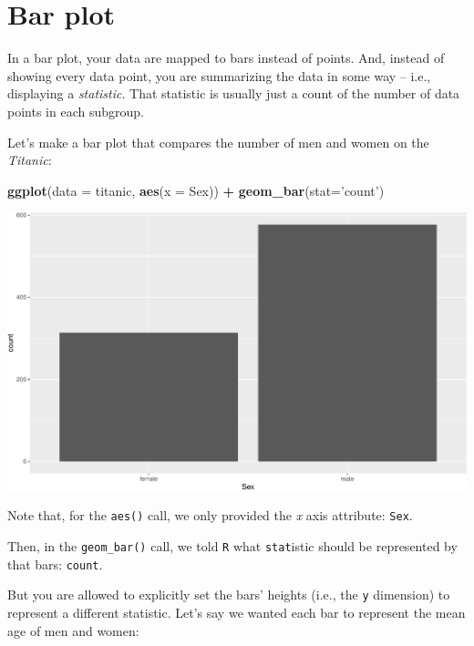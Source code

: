 \documentclass[]{book}
\newenvironment{Shaded}{\begin{snugshade}}{\end{snugshade}}
\newcommand{\DataTypeTok}[1]{\textcolor[rgb]{0.13,0.29,0.53}{#1}}
\newcommand{\KeywordTok}[1]{\textcolor[rgb]{0.13,0.29,0.53}{\textbf{#1}}}
\newcommand{\NormalTok}[1]{#1}
\newcommand{\OperatorTok}[1]{\textcolor[rgb]{0.81,0.36,0.00}{\textbf{#1}}}
\newcommand{\StringTok}[1]{\textcolor[rgb]{0.31,0.60,0.02}{#1}}
\begin{document}
\hypertarget{bar-plot}{%
\section*{Bar plot}\label{bar-plot}}

In a bar plot, your data are mapped to bars instead of points. And, instead of showing every data point, you are summarizing the data in some way -- i.e., displaying a \emph{statistic}. That statistic is usually just a count of the number of data points in each subgroup.

Let's make a bar plot that compares the number of men and women on the \emph{Titanic}:

\begin{Shaded}
\begin{Highlighting}[]
\KeywordTok{ggplot}\NormalTok{(}\DataTypeTok{data =}\NormalTok{ titanic, }
       \KeywordTok{aes}\NormalTok{(}\DataTypeTok{x =}\NormalTok{ Sex)) }\OperatorTok{+}\StringTok{ }
\StringTok{  }\KeywordTok{geom_bar}\NormalTok{(}\DataTypeTok{stat=}\StringTok{'count'}\NormalTok{)}
\end{Highlighting}
\end{Shaded}

\includegraphics{figures/unnamed-chunk-256-1.pdf}

Note that, for the \texttt{aes()} call, we only provided the \emph{x} axis attribute: \texttt{Sex}.

Then, in the \texttt{geom\_bar()} call, we told \texttt{R} what \texttt{stat}istic should be represented by that bars: \texttt{\textquotesingle{}count\textquotesingle{}}.

But you are allowed to explicitly set the bars' heights (i.e., the \texttt{y} dimension) to represent a different statistic. Let's say we wanted each bar to represent the mean age of men and women:
\end{document}
